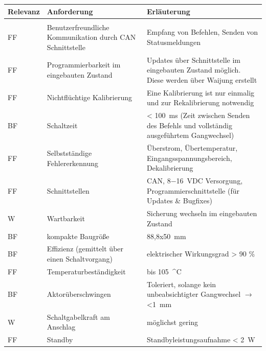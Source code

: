 \begin{table}[h]
	\centering
		\begin{tabular}{l|p{7cm}|p{7cm}}
			\textbf{Relevanz} & \textbf{Anforderung} & \textbf{Erläuterung} \\ \hline
			& &\\
			FF & Benutzerfreundliche Kommunikation durch CAN Schnittstelle & Empfang von Befehlen, Senden von Statusmeldungen \\ \hline
			FF & Programmierbarkeit im eingebauten Zustand & Updates über Schnittstelle im eingebauten Zustand möglich. Diese werden über Waijung erstellt\\ \hline
			FF & Nichtflüchtige Kalibrierung & Eine Kalibrierung ist nur einmalig und zur Rekalibrierung notwendig \\ \hline
			BF & Schaltzeit & < \SI{100}{ms} (Zeit zwischen Senden des Befehls und vollständig ausgeführtem Gangwechsel) \\ \hline
			FF & Selbstständige Fehlererkennung & Überstrom, Übertemperatur, Eingangsspannungsbereich, Dekalibrierung \\ \hline
			FF & Schnittstellen & CAN, \SI{8-16}{VDC} Versorgung, Programmierschnittstelle (für Updates \& Bugfixes) \\ \hline
			W & Wartbarkeit & Sicherung wechseln im eingebauten Zustand \\ \hline
			BF & kompakte Baugröße & 88,8x\SI{50}{mm}\\ \hline
			BF & Effizienz (gemittelt über einen Schaltvorgang) & elektrischer Wirkungsgrad > 90 \% \\ \hline
			FF & Temperaturbeständigkeit & bis \SI{105}{^\circ C} \\ \hline
			BF & Aktorüberschwingen & Toleriert, solange kein unbeabsichtigter Gangwechsel $\rightarrow$ \SI{<1}{mm} \\ \hline
			W & Schaltgabelkraft am Anschlag & möglichst gering \\ \hline
			FF & Standby & Standbyleistungsaufnahme < \SI{2}{W} \\ \hline
		\end{tabular}
	
	\label{tab:Anforderungsliste}
\end{table}

